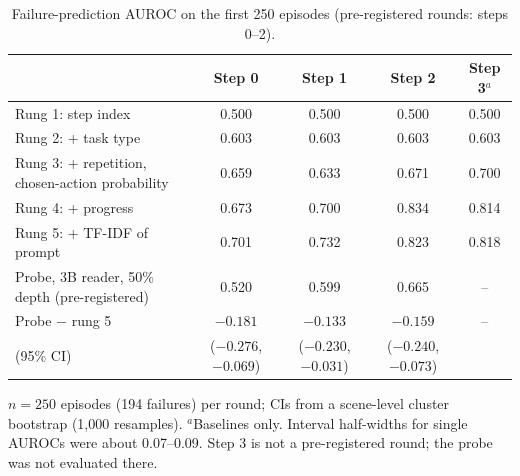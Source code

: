 \begin{table}[htbp]
\centering\small
\caption{Failure-prediction AUROC on the first 250 episodes (pre-registered rounds: steps 0--2).}\label{tab:ladder}
\begin{tabularx}{\linewidth}{@{}Lcccc@{}}
\toprule
 & Step 0 & Step 1 & Step 2 & Step 3$^{a}$ \\
\midrule
Rung 1: step index & 0.500 & 0.500 & 0.500 & 0.500 \\
Rung 2: + task type & 0.603 & 0.603 & 0.603 & 0.603 \\
Rung 3: + repetition, chosen-action probability & 0.659 & 0.633 & 0.671 & 0.700 \\
Rung 4: + progress & 0.673 & 0.700 & 0.834 & 0.814 \\
Rung 5: + TF-IDF of prompt & 0.701 & 0.732 & 0.823 & 0.818 \\
Probe, 3B reader, 50\% depth (pre-registered) & 0.520 & 0.599 & 0.665 & -- \\
\addlinespace
Probe $-$ rung 5 & $-0.181$ & $-0.133$ & $-0.159$ & -- \\
\quad (95\% CI) & ($-0.276$, $-0.069$) & ($-0.230$, $-0.031$) & ($-0.240$, $-0.073$) & \\
\bottomrule
\end{tabularx}
\par\smallskip\raggedright\footnotesize
$n = 250$ episodes (194 failures) per round; CIs from a scene-level cluster bootstrap (1,000 resamples). $^{a}$Baselines only. Interval half-widths for single AUROCs were about 0.07--0.09. Step 3 is not a pre-registered round; the probe was not evaluated there.
\end{table}
